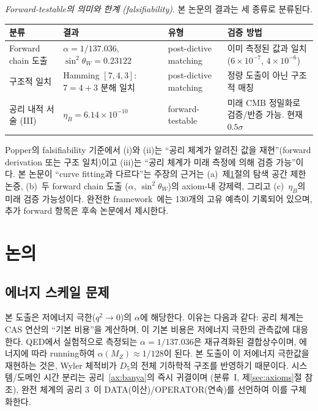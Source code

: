 \documentclass[entropy,article,submit,pdftex,oneauthor]{Definitions/mdpi}
\begin{document}
\emph{Forward-testable의 의미와 한계 (falsifiability)}.
본 논문의 결과는 세 종류로 분류된다.

\begin{center}
\small
\begin{tabular}{p{2.2cm}p{3.5cm}p{2.5cm}p{3.2cm}}
\toprule
\textbf{분류} & \textbf{결과} & \textbf{유형} & \textbf{검증 방법} \\
\midrule
Forward chain 도출 & $\alpha = 1/137.036$, $\sin^2\theta_W = 0.23122$ & post-dictive matching & 이미 측정된 값과 일치 ($6 \times 10^{-7}$, $4 \times 10^{-6}$) \\
구조적 일치 & Hamming $[7,4,3]$: $7 = 4+3$ 분해 일치 & post-dictive matching & 정량 도출이 아닌 구조적 매칭 \\
공리 내적 서술 (III) & $\eta_B = 6.14 \times 10^{-10}$ & forward-testable & 미래 CMB 정밀화로 검증/반증 가능. 현재 $0.5\sigma$ \\
\bottomrule
\end{tabular}
\end{center}

Popper의 falsifiability 기준에서 (i)와 (ii)는 ``공리 체계가 알려진 값을 재현''(forward derivation 또는 구조 일치)이고 (iii)는 ``공리 체계가 미래 측정에 의해 검증 가능''이다. 본 논문이 ``curve fitting과 다르다''는 주장의 근거는 (a)~제\ref{sec:discussion}절의 탐색 공간 제한 논증, (b)~두 forward chain 도출 ($\alpha$, $\sin^2\theta_W$)의 axiom-내 강제력, 그리고 (c)~$\eta_B$의 미래 검증 가능성이다. 완전한 framework~\cite{han2026}에는 130개의 고유 예측이 기록되어 있으며, 추가 forward 항목은 후속 논문에서 제시한다.

\section{논의}
\label{sec:discussion}

\subsection{에너지 스케일 문제}

본 도출은 저에너지 극한($q^2 \to 0$)의 $\alpha$에 해당한다. 이유는 다음과 같다: 공리 체계는 CAS 연산의 ``기본 비용''을 계산하며, 이 기본 비용은 저에너지 극한의 관측값에 대응한다. QED에서 실험적으로 측정되는 $\alpha = 1/137.036$은 재규격화된 결합상수이며, 에너지에 따라 running하여 $\alpha(M_Z) \approx 1/128$이 된다. 본 도출이 이 저에너지 극한값을 재현하는 것은, Wyler 체적비가 $D_5$의 전체 기하학적 구조를 반영하기 때문이다. 시스템/도메인 시간 분리는 공리~\ref{ax:banya}의 즉시 귀결이며 (분류~I, 제\ref{sec:axioms}절 참조), 완전 체계의 공리 3~\cite{han2026}이 DATA(이산)/OPERATOR(연속)를 선언하여 이를 구체화한다.
\end{document}
